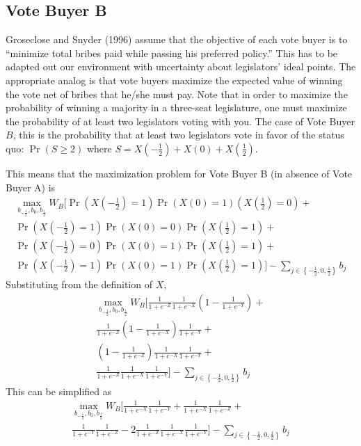 \documentclass[12pt]{article}
\begin{document}
\subsection{Vote Buyer B}
Groseclose and Snyder (1996) assume that the objective of each vote buyer is to ``minimize total bribes paid while passing his preferred policy.'' This has to be adapted out our environment with uncertainty about legislators' ideal points. The appropriate analog is that vote buyers maximize the expected value of winning the vote net of bribes that he/she must pay. Note that in order to maximize the probability of winning a majority in a three-seat legislature, one must maximize the probability of at least two legislators voting with you. The case of Vote Buyer $B$, this is the probability that at least two legislators vote in favor of the status quo: $\Pr(S \geq 2)$ where $S = X\left(-\frac{1}{2}\right) + X\left(0\right) + X\left(\frac{1}{2}\right)$.

This means that the maximization problem for Vote Buyer B (in absence of Vote Buyer A) is
			  \begin{multline}
			    \max_{b_{-\frac{1}{2}}, b_0, b_{\frac{1}{2}}} 
					W_B \biggl[ \Pr\left(X\left(-\frac{1}{2}\right)=1\right)\Pr\left(X\left(0\right)=1\right)\left(X\left(\frac{1}{2}\right)=0\right)  + \\
					\Pr\left(X\left(-\frac{1}{2}\right)=1\right)\Pr\left(X\left(0\right)=0\right)\Pr\left(X\left(\frac{1}{2}\right)=1\right) + \\
					\Pr\left(X\left(-\frac{1}{2}\right)=0\right)\Pr\left(X\left(0\right)=1\right)\Pr\left(X\left(\frac{1}{2}\right)=1\right) + \\
					\Pr\left(X\left(-\frac{1}{2}\right)=1\right)\Pr\left(X\left(0\right)=1\right)\Pr\left(X\left(\frac{1}{2}\right)=1\right) \biggr] - \sum_{j\in \left\{-\frac{1}{2}, 0,\frac{1}{2}\right\}} b_j
				\end{multline}
			Substituting from the definition of $X$,
			  \begin{multline}
			    \max_{b_{-\frac{1}{2}}, b_0, b_{\frac{1}{2}}} 
					W_B \biggl[ \frac{1}{1+e^{-Z}} \frac{1}{1+e^{-X}} \left(1-\frac{1}{1+e^{-Y}}\right)  + \\
					\frac{1}{1+e^{-Z}} \left(1-\frac{1}{1+e^{-X}}\right) \frac{1}{1+e^{-Y}} + \\
					\left(1-\frac{1}{1+e^{-Z}} \right) \frac{1}{1+e^{-X}} \frac{1}{1+e^{-Y}} + \\
					\frac{1}{1+e^{-Z}} \frac{1}{1+e^{-X}} \frac{1}{1+e^{-Y}} \biggr] - \sum_{j\in \left\{-\frac{1}{2}, 0,\frac{1}{2}\right\}} b_j
				\end{multline}
			This can be simplified as 
			  \begin{multline}
			    \max_{b_{-\frac{1}{2}}, b_0, b_{\frac{1}{2}}} 
					W_B \biggl[ \frac{1}{1+e^{-X}} \frac{1}{1+e^{-Y}} +
					\frac{1}{1+e^{-X}} \frac{1}{1+e^{-Z}} + \\
					\frac{1}{1+e^{-Y}} \frac{1}{1+e^{-Z}} - 2	\frac{1}{1+e^{-Z}} \frac{1}{1+e^{-X}} \frac{1}{1+e^{-Y}} \biggr] - \sum_{j\in \left\{-\frac{1}{2}, 0,\frac{1}{2}\right\}} b_j
					\label{eq:objb}
				\end{multline}
		
\end{document}
